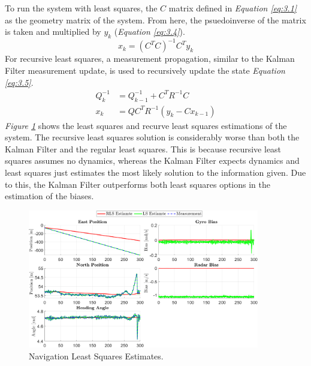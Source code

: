 \documentclass[10pt]{article}
\begin{document}
\begin{enumerate}[label=\textbf{\arabic*.}]
  To run the system with least squares, the $C$ matrix defined in 
  \emph{Equation \ref{eq:3.1}} as the geometry matrix of the system. From here, the 
  psuedoinverse of the matrix is taken and multiplied by $y_k$ 
  (\emph{Equation \ref{eq:3.4}}).
  \begin{equation}
    x_{k} = (C^TC)^{-1}C^Ty_k
    \label{eq:3.4}
  \end{equation}
  For recursive least squares, a measurement propagation, similar to the Kalman 
  Filter measurement update, is used to recursively update the state 
  \emph{Equation \ref{eq:3.5}}.
  \begin{equation}
    \begin{split}
      Q_{k}^{-1} &= Q_{k-1}^{-1} + C^T R^{-1} C \\
      x_{k} &= Q C^T R^{-1} (y_k - C x_{k-1})
    \end{split}
    \label{eq:3.5}
  \end{equation}
  \emph{Figure \ref{f:3.2}} shows the least squares and recurve least squares 
  estimations of the system. The recursive least squares solution is considerably 
  worse than both the Kalman Filter and the regular least squares. This is because 
  recursive least squares assumes no dynamics, whereas the Kalman Filter expects 
  dynamics and least squares just estimates the most likely solution to the 
  information given. Due to this, the Kalman Filter outperforms both least 
  squares options in the estimation of the biases.
  \begin{figure}[H]
    \centering
    \includegraphics[width=0.9\textwidth]{p3_b2.png}
    \caption{Navigation Least Squares Estimates.}
    \label{f:3.2}
  \end{figure}


\end{enumerate}
\end{document}
